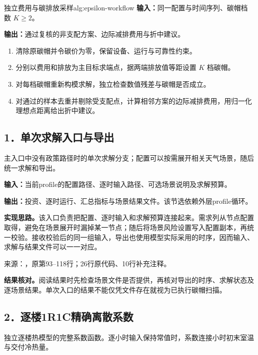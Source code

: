 \begin{paperalgorithm}{独立费用与碳排放采样}{alg:epsilon-workflow}
\noindent\textbf{输入：}同一配置与时间序列、碳帽档数 $K\geq2$。\par
\noindent\textbf{输出：}通过复核的非支配方案、边际减排费用与折中建议。
\begin{enumerate}[label=\arabic*.,leftmargin=1.8em,itemsep=2pt,topsep=3pt,parsep=0pt]
\item 清除原碳帽并令碳价为零，保留设备、运行与可靠性约束。
\item 分别以费用和排放为主目标求端点，据两端排放值等距设置 $K$ 档碳帽。
\item 对每档碳帽重新构模求解，独立检查数值残差与碳帽是否成立。
\item 对通过的样本去重并剔除受支配点，计算相邻方案的边际减排费用，用归一化理想点距离给出折中建议。
\end{enumerate}
\end{paperalgorithm}


\subsection*{1．单次求解入口与导出}
主入口中没有政策路径时的单次求解分支；配置可以按需展开相关天气场景，随后统一求解和导出。

\noindent\textbf{输入：}当前profile的配置路径、逐时输入路径、可选场景说明及求解预算。\par
\noindent\textbf{输出：}投资、逐时运行、汇总指标与场景结果文件。该节选依赖外层profile循环。\par

\noindent\textbf{实现思路。}该入口负责把配置、逐时输入和求解预算连接起来。需求列从节点配置取得，避免在场景展开时漏掉某一节点；随后将场景风险设置写入配置副本，再统一校验。接收校验后的同一组输入，导出也使用模型实际采用的时序，因而输入、求解与结果文件可以一一对应。

{\small 来源：，原第93--118行；26行原代码、10行补充注释。}\par

\begingroup
{}

\endgroup

\noindent\textbf{结果核对。}阅读结果时先检查场景文件是否提供，再核对导出的时序、求解状态及逐场景结果。单次入口的结果不能仅凭文件存在就视为已执行碳帽扫描。

\subsection*{2．逐楼1R1C精确离散系数}
独立逐楼热模型的完整系数函数。逐小时输入保持常值时，系数连接小时初末室温与交付冷热量。

